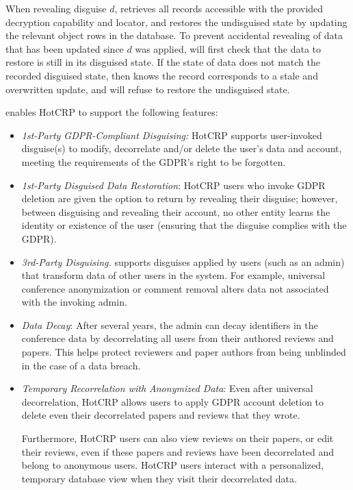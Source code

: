 When revealing disguise $d$, \sys retrieves all records accessible with the provided decryption capability
and locator, and restores the undisguised state by updating the relevant object rows in the database. 
To prevent accidental revealing of data that has been updated since $d$ was applied, 
\sys will first check that the data to restore is still in its disguised state. If the state of data does
not match the recorded disguised state, then \sys knows the record corresponds to a stale and
overwritten update, and will refuse to restore the undisguised state.


\iffalse
\sys enables HotCRP to support the following features:
\begin{itemize}
    \item\emph{1st-Party GDPR-Compliant Disguising:}
HotCRP supports user-invoked disguise(s) to modify, decorrelate and/or delete the user's data and
account, meeting the requirements of the GDPR's right to be forgotten.

    \item \emph{1st-Party Disguised Data Restoration}: HotCRP users who invoke GDPR deletion are given the
        option to return by revealing their disguise; however, between disguising and revealing
        their account, no other entity learns the identity or existence of the user (ensuring that
        the disguise complies with the GDPR).

    \item\emph{3rd-Party Disguising.}
\sys supports disguises applied by users (such as an admin) that transform data of other users in the system. For example, universal conference anonymization or
    comment removal alters data not associated with the invoking admin.

\item \emph{Data Decay}: After several years, the admin can decay identifiers in the conference data
    by decorrelating all users from their authored reviews and papers.  This helps protect reviewers
        and paper authors from being unblinded in the case of a data breach.

\item \emph{Temporary Recorrelation with Anonymized Data}:
Even after universal decorrelation, HotCRP allows users to apply GDPR account
deletion to delete even their decorrelated papers and reviews that they wrote.
%

%
Furthermore, HotCRP users can also view reviews on their papers, or edit their reviews, even if
        these papers and reviews have been decorrelated and belong to anonymous users.  HotCRP users
        interact with a personalized, temporary database view when they visit their decorrelated
        data.


\end{itemize}
